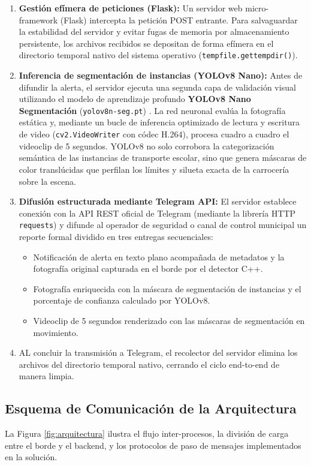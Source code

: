 \documentclass[12pt]{article}
\begin{document}
\begin{enumerate}
    \item \textbf{Gestión efímera de peticiones (Flask):} Un servidor web micro-framework (Flask) intercepta la petición POST entrante. Para salvaguardar la estabilidad del servidor y evitar fugas de memoria por almacenamiento persistente, los archivos recibidos se depositan de forma efímera en el directorio temporal nativo del sistema operativo (\texttt{tempfile.gettempdir()}).
    \item \textbf{Inferencia de segmentación de instancias (YOLOv8 Nano):} Antes de difundir la alerta, el servidor ejecuta una segunda capa de validación visual utilizando el modelo de aprendizaje profundo \textbf{YOLOv8 Nano Segmentación} (\texttt{yolov8n-seg.pt}) \cite{jocher2023yolo}. La red neuronal evalúa la fotografía estática y, mediante un bucle de inferencia optimizado de lectura y escritura de video (\texttt{cv2.VideoWriter} con códec H.264), procesa cuadro a cuadro el videoclip de 5 segundos. YOLOv8 no solo corrobora la categorización semántica de las instancias de transporte escolar, sino que genera máscaras de color translúcidas que perfilan los límites y silueta exacta de la carrocería sobre la escena.
    \item \textbf{Difusión estructurada mediante Telegram API:} El servidor establece conexión con la API REST oficial de Telegram \cite{telegram2015api} (mediante la librería HTTP \texttt{requests}) y difunde al operador de seguridad o canal de control municipal un reporte formal dividido en tres entregas secuenciales:
    \begin{itemize}
        \item Notificación de alerta en texto plano acompañada de metadatos y la fotografía original capturada en el borde por el detector C++.
        \item Fotografía enriquecida con la máscara de segmentación de instancias y el porcentaje de confianza calculado por YOLOv8.
        \item Videoclip de 5 segundos renderizado con las máscaras de segmentación en movimiento.
    \end{itemize}
    \item AL concluir la transmisión a Telegram, el recolector del servidor elimina los archivos del directorio temporal nativo, cerrando el ciclo end-to-end de manera limpia.
\end{enumerate}

\subsection{Esquema de Comunicación de la Arquitectura}
La Figura \ref{fig:arquitectura} ilustra el flujo inter-procesos, la división de carga entre el borde y el backend, y los protocolos de paso de mensajes implementados en la solución.
\end{document}
